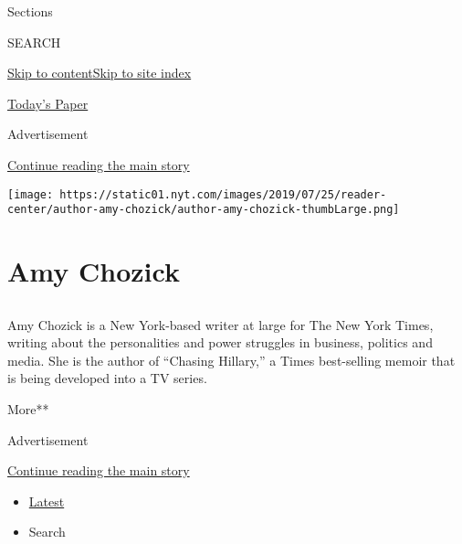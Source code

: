 Sections

SEARCH

\protect\hyperlink{site-content}{Skip to
content}\protect\hyperlink{site-index}{Skip to site index}

\href{https://myaccount.nytimes.com/auth/login?response_type=cookie\&client_id=vi}{}

\href{https://www.nytimes.com/section/todayspaper}{Today's Paper}

Advertisement

\protect\hyperlink{after-top}{Continue reading the main story}

\texttt{[image: https://static01.nyt.com/images/2019/07/25/reader-center/author-amy-chozick/author-amy-chozick-thumbLarge.png]}

\hypertarget{amy-chozick}{%
\section{Amy Chozick}\label{amy-chozick}}

\subsection{}

Amy Chozick is a New York-based writer at large for The New York Times,
writing about the personalities and power struggles in business,
politics and media. She is the author of ``Chasing Hillary,'' a Times
best-selling memoir that is being developed into a TV series.

More**

Advertisement

\protect\hyperlink{after-mid1}{Continue reading the main story}

\begin{itemize}
\tightlist
\item
  \protect\hyperlink{stream-panel}{Latest}
\item
  Search
\end{itemize}

